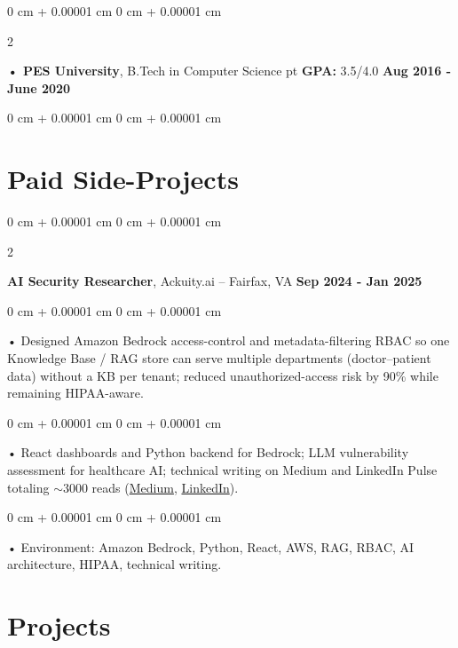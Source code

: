 \documentclass[10pt, letterpaper]{article}
\newenvironment{onecolentry}{
    \begin{adjustwidth}{
        0 cm + 0.00001 cm
    }{
        0 cm + 0.00001 cm
    }
}{
    \end{adjustwidth}
} %
\newenvironment{twocolentry}[2][]{
    \onecolentry
    \def\secondColumn{#2}
    \setcolumnwidth{\fill, 4.5 cm}
    \begin{paracol}{2}
}{
    \switchcolumn \raggedleft \secondColumn
    \end{paracol}
    \endonecolentry
} %
\begin{document}
        \begin{twocolentry}{
            \textbf{Aug 2016 - June 2020}
        }
            \textbf{ • PES University}, B.Tech in Computer Science  pt \textbf{GPA:} 3.5/4.0  \end{twocolentry}
        \begin{onecolentry}

                        \vspace{0.3cm}
    \section{Paid Side-Projects}
            \vspace{2 pt }
                    \begin{twocolentry}{
            \textbf{Sep 2024 - Jan 2025}
        }
            \textbf{AI Security Researcher}, Ackuity.ai -- Fairfax, VA\end{twocolentry}

        \begin{onecolentry}
             • Designed Amazon Bedrock access-control and metadata-filtering RBAC so one Knowledge Base / RAG store can serve multiple departments (doctor--patient data) without a KB per tenant; reduced unauthorized-access risk by 90\% while remaining HIPAA-aware.
        \end{onecolentry}
        \begin{onecolentry}
             • React dashboards and Python backend for Bedrock; LLM vulnerability assessment for healthcare AI; technical writing on Medium and LinkedIn Pulse totaling $\sim$3000 reads (\href{https://medium.com/@sreenikethaathreya/building-a-permission-aware-genai-application-on-amazon-bedrock-8fdc2410dd43}{Medium}, \href{https://www.linkedin.com/pulse/building-permission-aware-genai-application-amazon-bedrock-aathreya-g7nme/}{LinkedIn}).
        \end{onecolentry}
        \begin{onecolentry}
             • Environment: Amazon Bedrock, Python, React, AWS, RAG, RBAC, AI architecture, HIPAA, technical writing.
        \end{onecolentry}

             \vspace{2 pt }

        \vspace{0.3cm}
\section{Projects}
    \vspace{2 pt}
\end{onecolentry}
\end{document}
